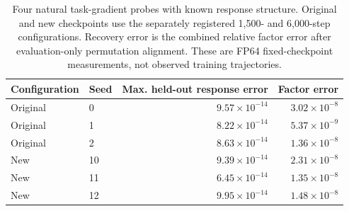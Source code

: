 \begin{table}[t]
\centering\small
\caption{Four natural task-gradient probes with known response structure. Original and new checkpoints use the separately registered 1,500- and 6,000-step configurations. Recovery error is the combined relative factor error after evaluation-only permutation alignment. These are FP64 fixed-checkpoint measurements, not observed training trajectories.}
\label{tab:natural-gradients}
\begin{tabular}{llrr}
\toprule
Configuration & Seed & Max. held-out response error & Factor error \\
\midrule
Original & 0 & $9.57\times10^{-14}$ & $3.02\times10^{-8}$ \\
Original & 1 & $8.22\times10^{-14}$ & $5.37\times10^{-9}$ \\
Original & 2 & $8.63\times10^{-14}$ & $1.36\times10^{-8}$ \\
New & 10 & $9.39\times10^{-14}$ & $2.31\times10^{-8}$ \\
New & 11 & $6.45\times10^{-14}$ & $1.35\times10^{-8}$ \\
New & 12 & $9.95\times10^{-14}$ & $1.48\times10^{-8}$ \\
\bottomrule
\end{tabular}
\end{table}
